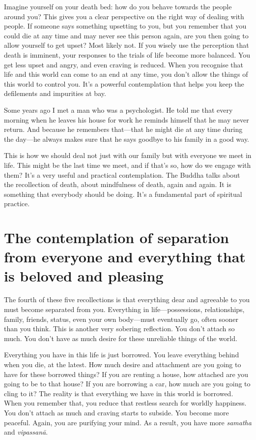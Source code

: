 \documentclass[12pt,openany]{book}
\begin{document}
Imagine yourself on your death bed: how do you behave towards the people around you? This gives you a clear perspective on the right way of dealing with people. If someone says something upsetting to you, but you remember that you could die at any time and may never see this person again, are you then going to allow yourself to get upset? Most likely not. If you wisely use the perception that death is imminent, your responses to the trials of life become more balanced. You get less upset and angry, and even craving is reduced. When you recognise that life and this world can come to an end at any time, you don't allow the things of this world to control you. It’s a powerful contemplation that helps you keep the defilements and impurities at bay.

Some years ago I met a man who was a psychologist. He told me that every morning when he leaves his house for work he reminds himself that he may never return. And because he remembers that—that he might die at any time during the day—he always makes sure that he says goodbye to his family in a good way.

This is how we should deal not just with our family but with everyone we meet in life. This might be the last time we meet, and if that's so, how do we engage with them? It’s a very useful and practical contemplation. The Buddha talks about the recollection of death, about mindfulness of death, again and again. It is something that everybody should be doing. It's a fundamental part of spiritual practice.

\section*{The contemplation of separation from everyone and everything that is beloved and pleasing}

The fourth of these five recollections is that everything dear and agreeable to you must become separated from you. Everything in life—possessions, relationships, family, friends, status, even your own body—must eventually go, often sooner than you think. This is another very sobering reflection. You don’t attach so much. You don’t have as much desire for these unreliable things of the world.

Everything you have in this life is just borrowed. You leave everything behind when you die, at the latest. How much desire and attachment are you going to have for these borrowed things? If you are renting a house, how attached are you going to be to that house? If you are borrowing a car, how much are you going to cling to it? The reality is that everything we have in this world is borrowed. When you remember that, you reduce that restless search for worldly happiness. You don’t attach as much and craving starts to subside. You become more peaceful. Again, you are purifying your mind. As a result, you have more \textit{samatha} and \textit{vipassanā}.
\end{document}
